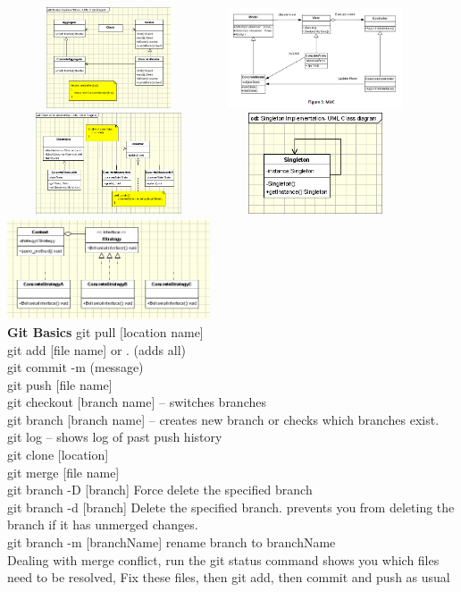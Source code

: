 \documentclass{article}
\begin{document}
\includegraphics[width=6cm,height =3cm]{it.png}
\includegraphics[width=6cm,height =3cm]{mvc.png}\\
\includegraphics[width=6cm,height =3cm]{obs.png}
\includegraphics[width=6cm,height =3cm]{singleton.png}
\includegraphics[width=6cm,height =3cm]{strategy.png}\\
\textbf{Git Basics}
git pull [location name]\\
git add [file name] or . (adds all)\\
git commit -m (message)\\
git push [file name]\\
git checkout [branch name] -- switches branches\\
git branch [branch name] -- creates new branch or checks which branches exist.\\
git log -- shows log of past push history\\
git clone [location]\\
git merge [file name] \\
git branch -D [branch] Force delete the specified branch\\
git branch -d [branch] Delete the specified branch. prevents you from deleting the branch if it has unmerged changes.\\
git branch -m [branchName] rename branch to branchName\\
Dealing with merge conflict, run the git status command shows you which files need to be resolved, Fix these files, then git add, then commit and push as usual\\
\end{document}
